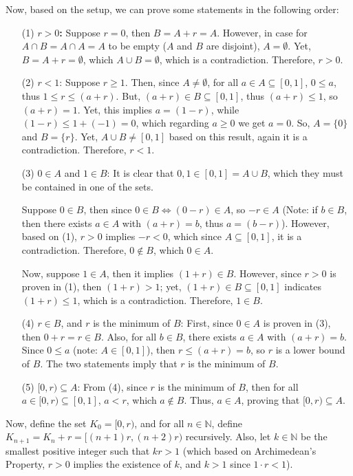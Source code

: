 \documentclass{article}
\begin{document}
Now, based on the setup, we can prove some statements in the following order:
\begin{itemize}
    \item[(1)] \textbf{$r>0$:} Suppose $r=0$, then $B = A+r = A$. However, in case for $A\cap B = A\cap A = A$ to be empty ($A$ and $B$ are disjoint), $A=\emptyset$. Yet, $B=A+r=\emptyset$, which $A\cup B=\emptyset$, which is a contradiction. Therefore, $r>0$.

    \item[(2)] $r<1$: Suppose $r\geq 1$. Then, since $A\neq \emptyset$, for all $a\in A \subseteq [0,1]$, $0\leq a$, thus $1 \leq r \leq (a+r)$. But, $(a+r)\in B\subseteq [0,1]$, thus $(a+r) \leq 1$, so $(a+r)=1$. Yet, this implies $a = (1-r)$, while $(1-r) \leq 1+(-1)=0$, which regarding $a \geq 0$ we get $a=0$. So, $A=\{0\}$ and $B=\{r\}$. Yet, $A\cup B\neq [0,1]$ based on this result, again it is a contradiction. Therefore, $r<1$.

    \item[(3)] $0\in A$ and $1\in B$: It is clear that $0,1\in[0,1]=A\cup B$, which they must be contained in one of the sets.

    Suppose $0\in B$, then since $0\in B\iff (0-r)\in A$, so $-r\in A$ (Note: if $b\in B$, then there exists $a\in A$ with $(a+r)=b$, thus $a=(b-r)$). However, based on (1), $r>0$ implies $-r<0$, which since $A\subseteq [0,1]$, it is a contradiction. Therefore, $0\notin B$, which $0\in A$.

    Now, suppose $1\in A$, then it implies $(1+r)\in B$. However, since $r>0$ is proven in (1), then $(1+r)>1$; yet, $(1+r)\in B\subseteq [0,1]$ indicates $(1+r)\leq 1$, which is a contradiction. Therefore, $1\in B$.

    \item[(4)] $r\in B$, and $r$ is the minimum of $B$: First, since $0\in A$ is proven in (3), then $0+r=r\in B$. Also, for all $b\in B$, there exists $a\in A$ with $(a+r)=b$. Since $0 \leq a$ (note: $A\in[0,1]$), then $r\leq (a+r)=b$, so $r$ is a lower bound of $B$. The two statements imply that $r$ is the minimum of $B$.

    \item[(5)] $[0,r)\subseteq A$: From (4), since $r$ is the minimum of $B$, then for all $a\in[0,r)\subseteq [0,1]$, $a<r$, which $a\notin B$. Thus, $a\in A$, proving that $[0,r)\subseteq A$.
\end{itemize}

Now, define the set $K_0 = [0,r)$, and for all $n\in\mathbb{N}$, define $K_{n+1}=K_{n}+r=[(n+1)r,(n+2)r)$ recursively. Also, let $k\in\mathbb{N}$ be the smallest positive integer such that $kr >1$ (which based on Archimedean's Property, $r>0$ implies the existence of $k$, and $k>1$ since $1\cdot r <1$).
\end{document}
